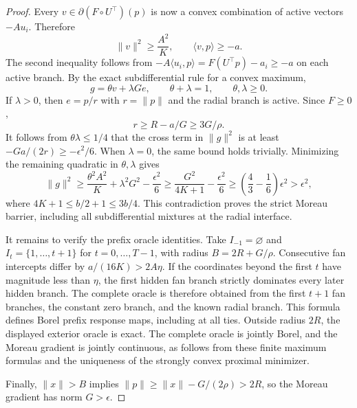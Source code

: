 \begin{appendix}
\begin{proof}
Every $v\in\partial(F\circ U^\top)(p)$ is now a convex
combination of active vectors $-Au_i$. Therefore
\[
 \|v\|^2\ge\frac{A^2}{K},
 \qquad
 \langle v,p\rangle\ge-a.
\]
The second inequality follows from
$-A\langle u_i,p\rangle=F(U^\top p)-a_i\ge-a$
on each active branch. By the exact subdifferential rule for a
convex maximum,
\[
 g=\theta v+\lambda G e,\qquad
 \theta+\lambda=1,\qquad \theta,\lambda\ge0.
\]
If $\lambda>0$, then $e=p/r$ with $r=\|p\|$ and the radial
branch is active. Since $F\ge0$,
\[
 r\ge R-a/G\ge3G/\rho.
\]
It follows from $\theta\lambda\le1/4$ that the cross term in
$\|g\|^2$ is at least $-Ga/(2r)\ge-\epsilon^2/6$.
When $\lambda=0$, the same bound holds trivially. Minimizing the
remaining quadratic in $\theta,\lambda$ gives
\[
 \|g\|^2
 \ge\frac{\theta^2A^2}{K}+\lambda^2G^2-\frac{\epsilon^2}{6}
 \ge\frac{G^2}{4K+1}-\frac{\epsilon^2}{6}
 \ge\left(\frac43-\frac16\right)\epsilon^2
 >\epsilon^2,
\]
where $4K+1\le b/2+1\le3b/4$.
This contradiction proves the strict Moreau barrier, including
all subdifferential mixtures at the radial interface.

It remains to verify the prefix oracle identities.
Take $I_{-1}=\varnothing$ and $I_t=\{1,\ldots,t+1\}$ for
$t=0,\ldots,T-1$, with radius $B=2R+G/\rho$.
Consecutive fan intercepts differ by
$a/(16K)>2A\eta$. If the coordinates beyond the first $t$ have
magnitude less than $\eta$, the first hidden fan branch strictly
dominates every later hidden branch. The complete oracle is
therefore obtained from the first $t+1$ fan branches, the constant
zero branch, and the known radial branch. This formula defines
Borel prefix response maps, including at all ties.
Outside radius $2R$, the displayed exterior oracle is exact.
The complete oracle is jointly Borel, and the Moreau gradient is
jointly continuous, as follows from these finite maximum formulas
and the uniqueness of the strongly convex proximal minimizer.

Finally, $\|x\|>B$ implies $\|p\|\ge\|x\|-G/(2\rho)>2R$,
so the Moreau gradient has norm $G>\epsilon$.
\end{proof}

\end{appendix}


